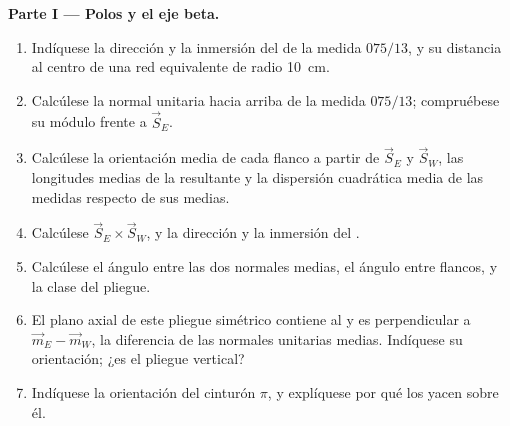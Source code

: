\begin{problem}
\medskip\noindent\textbf{Parte I --- Polos y el eje beta.}
\begin{enumerate}
  \item Indíquese la dirección y la inmersión del  de la medida $075/13$, y
        su distancia al centro de una red equivalente de radio
        \qty{10}{cm}.
  \item Calcúlese la normal unitaria hacia arriba de la medida $075/13$; compruébese
        su módulo frente a $\vec S_E$.
  \item Calcúlese la orientación media de cada flanco a partir de $\vec S_E$ y $\vec S_W$,
        las longitudes medias de la resultante y la dispersión cuadrática media de las
        medidas respecto de sus medias.
  \item Calcúlese $\vec S_E\times\vec S_W$, y la dirección y la inmersión del
        .
  \item Calcúlese el ángulo entre las dos normales medias, el ángulo entre flancos,
        y la clase del pliegue.
  \item El plano axial de este pliegue simétrico contiene al  y es
        perpendicular a $\vec m_E - \vec m_W$, la diferencia de las normales unitarias
        medias. Indíquese su orientación; ¿es el pliegue vertical?
  \item Indíquese la orientación del cinturón $\pi$, y explíquese por qué los  yacen
        sobre él.
\end{enumerate}


\end{problem}
